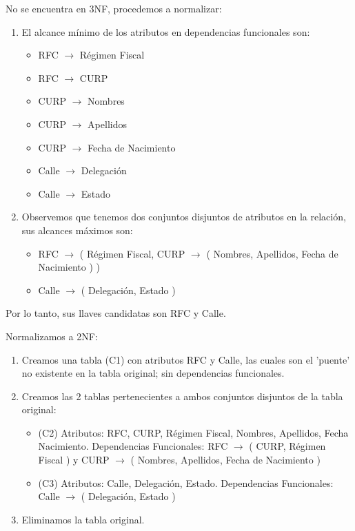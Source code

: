 \documentclass{article}
\begin{document}
       \noindent No se encuentra en 3NF, procedemos a normalizar:
       \begin{enumerate}
       \item El alcance mínimo de los atributos en dependencias funcionales son:
         \begin{multicols}{2}
           \begin{itemize}
           \item RFC $\rightarrow$ Régimen Fiscal
           \item RFC $\rightarrow$ CURP
           \item CURP $\rightarrow$ Nombres
           \item CURP $\rightarrow$ Apellidos
           \item CURP $\rightarrow$ Fecha de Nacimiento
           \item Calle $\rightarrow$ Delegación
           \item Calle $\rightarrow$ Estado
           \end{itemize}
         \end{multicols}
       \item Observemos que tenemos dos conjuntos disjuntos de atributos en la relación,
         sus alcances máximos son:
         \begin{itemize}
         \item RFC $\rightarrow$ ( Régimen Fiscal, CURP $\rightarrow$
           ( Nombres, Apellidos, Fecha de Nacimiento ) )
         \item Calle $\rightarrow$ ( Delegación, Estado )
         \end{itemize}
         \end{enumerate}
         Por lo tanto, sus llaves candidatas son RFC y Calle.
       \item Normalizamos a 2NF:
         \begin{enumerate}
         \item Creamos una tabla (C1) con atributos RFC y Calle, las cuales son el 'puente'
           no existente en la tabla original; sin dependencias funcionales.
         \item Creamos las 2 tablas pertenecientes a ambos conjuntos disjuntos de la tabla original:
           \begin{itemize}
           \item (C2) Atributos: RFC, CURP, Régimen Fiscal, Nombres, Apellidos, Fecha Nacimiento.
             Dependencias Funcionales: RFC $\rightarrow$ ( CURP, Régimen Fiscal ) y
             CURP $\rightarrow$ ( Nombres, Apellidos, Fecha de Nacimiento )
           \item (C3) Atributos: Calle, Delegación, Estado. Dependencias Funcionales:
             Calle $\rightarrow$ ( Delegación, Estado )
           \end{itemize}
         \item Eliminamos la tabla original.
         \end{enumerate}
\end{document}
